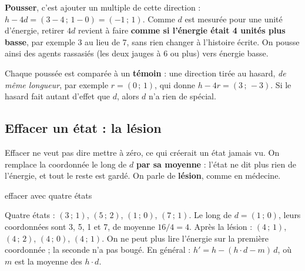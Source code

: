 \documentclass[fontsize=10pt,paper=a4,parskip=half-]{scrartcl}
\newcommand{\q}[1]{\og #1\fg{}}
\newcommand{\vect}[2]{(#1\,;\,#2)}
\begin{document}
\textbf{Pousser}, c'est ajouter un multiple de cette direction :
$h - 4d = \vect{3-4}{1-0} = \vect{-1}{1}$. Comme $d$ est mesurée \q{pour une unité
d'énergie}, retirer $4d$ revient à faire \textbf{comme si l'énergie était 4 unités plus
basse}, par exemple 3 au lieu de 7, sans rien changer à l'histoire écrite. On pousse
ainsi des agents \q{rassasiés} (les deux jauges à 6 ou plus) vers \q{énergie basse}.

Chaque poussée est comparée à un \textbf{témoin} : une direction tirée au hasard,
\emph{de même longueur}, par exemple $r=\vect{0}{1}$, qui donne $h-4r = \vect{3}{-3}$. Si
le hasard fait autant d'effet que $d$, alors $d$ n'a rien de spécial.

\subsection{Effacer un état : la lésion}
Effacer ne veut pas dire mettre à zéro, ce qui créerait un état jamais vu. On remplace
la coordonnée le long de $d$ \textbf{par sa moyenne} : l'état ne dit plus rien de
l'énergie, et tout le reste est gardé. On parle de \textbf{lésion}, comme en médecine.

\begin{calcul}{effacer avec quatre états}
\begin{minipage}{0.56\linewidth}
\raggedright
Quatre états : $\vect{3}{1}$, $\vect{5}{2}$, $\vect{1}{0}$, $\vect{7}{1}$. Le long de
$d=\vect{1}{0}$, leurs coordonnées sont 3, 5, 1 et 7, de moyenne $16/4 = 4$.
Après la lésion : $\vect{4}{1}$, $\vect{4}{2}$, $\vect{4}{0}$, $\vect{4}{1}$.
On ne peut plus lire l'énergie sur la première coordonnée ; la seconde n'a pas bougé.
En général : $h' = h - (h\cdot d - m)\, d$, où $m$ est la moyenne des $h\cdot d$.
\end{minipage}\hfill
\begin{minipage}{0.4\linewidth}
\centering
{}
\end{minipage}
\end{calcul}
\end{document}
